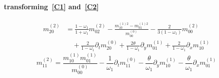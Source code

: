 \documentclass{article}
\begin{document}
  \paragraph{transforming~\eqref{C1} and~\eqref{C2}}
  \begin{equation}
    \label{C3}\tag{C3}
    \begin{aligned}
      m_{20}^{(2)} &= \frac{1-\omega_1}{1+\omega_1}m_{02}^{(2)}
      - \frac{ m_{10}^{(1)2} - m_{01}^{(1)2}}{m_{00}^{(0)}} - \frac{ 2}{3(1-\omega_1)}m_{00}^{(2)}
      \\&\quad
      + \frac{2}{1-\omega_1}\partial_t m_{20}^{(0)} + \frac{2\theta}{1-\omega_1}\partial_y m_{01}^{(1)} + \frac{2}{1-\omega_1}\partial_x m_{10}^{(1)}
    \end{aligned}
  \end{equation}
  \begin{equation}
    \label{C4}\tag{C4}
    m_{11}^{(2)} =  \frac{ m_{10}^{(1)}m_{01}^{(1)}}{m_{00}^{(0)}} - \frac{1}{\omega_1} \partial_t m_{11}^{(0)} - \frac{\theta}{\omega_1}\partial_y m_{10}^{(1)} - \frac{\theta}{\omega_1}\partial_x m_{01}^{(1)}
  \end{equation}
\end{document}
